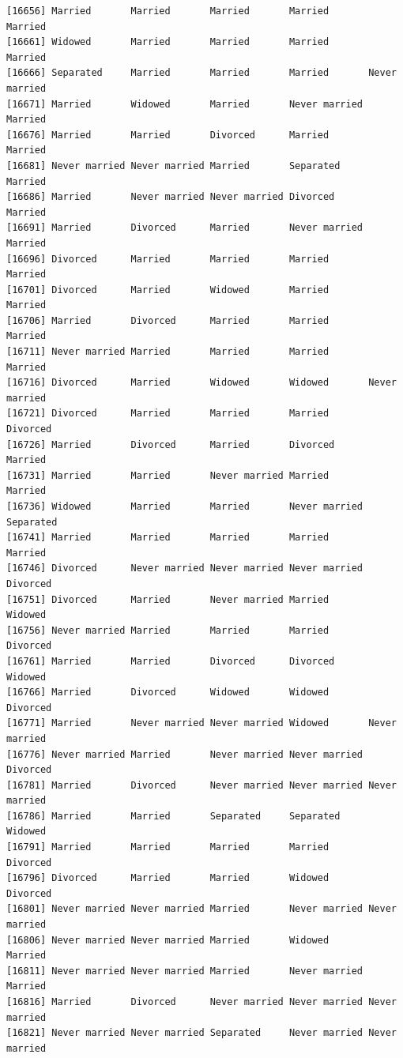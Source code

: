 \documentclass[
  letterpaper,
  DIV=11,
  numbers=noendperiod,
  oneside]{scrartcl}
\begin{document}
\begin{verbatim}
[16656] Married       Married       Married       Married       Married      
[16661] Widowed       Married       Married       Married       Married      
[16666] Separated     Married       Married       Married       Never married
[16671] Married       Widowed       Married       Never married Married      
[16676] Married       Married       Divorced      Married       Married      
[16681] Never married Never married Married       Separated     Married      
[16686] Married       Never married Never married Divorced      Married      
[16691] Married       Divorced      Married       Never married Married      
[16696] Divorced      Married       Married       Married       Married      
[16701] Divorced      Married       Widowed       Married       Married      
[16706] Married       Divorced      Married       Married       Married      
[16711] Never married Married       Married       Married       Married      
[16716] Divorced      Married       Widowed       Widowed       Never married
[16721] Divorced      Married       Married       Married       Divorced     
[16726] Married       Divorced      Married       Divorced      Married      
[16731] Married       Married       Never married Married       Married      
[16736] Widowed       Married       Married       Never married Separated    
[16741] Married       Married       Married       Married       Married      
[16746] Divorced      Never married Never married Never married Divorced     
[16751] Divorced      Married       Never married Married       Widowed      
[16756] Never married Married       Married       Married       Divorced     
[16761] Married       Married       Divorced      Divorced      Widowed      
[16766] Married       Divorced      Widowed       Widowed       Divorced     
[16771] Married       Never married Never married Widowed       Never married
[16776] Never married Married       Never married Never married Divorced     
[16781] Married       Divorced      Never married Never married Never married
[16786] Married       Married       Separated     Separated     Widowed      
[16791] Married       Married       Married       Married       Divorced     
[16796] Divorced      Married       Married       Widowed       Divorced     
[16801] Never married Never married Married       Never married Never married
[16806] Never married Never married Married       Widowed       Married      
[16811] Never married Never married Married       Never married Married      
[16816] Married       Divorced      Never married Never married Never married
[16821] Never married Never married Separated     Never married Never married

\end{verbatim}
\end{document}
